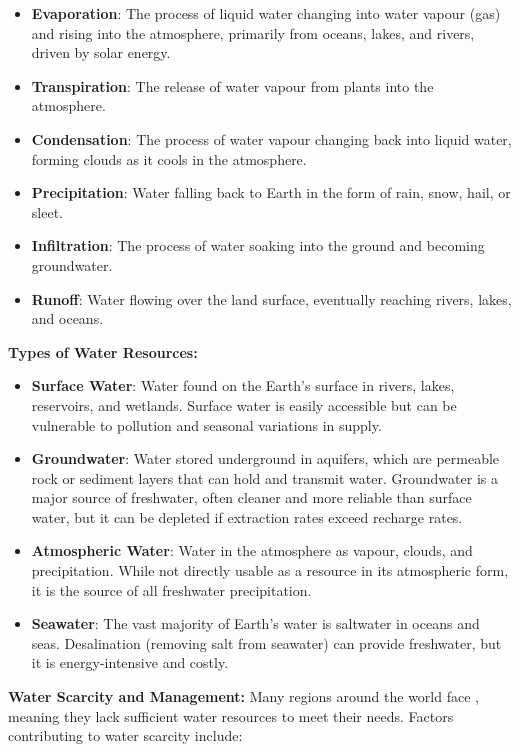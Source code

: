 \begin{itemize}
    \item \textbf{Evaporation}:  The process of liquid water changing into water vapour (gas) and rising into the atmosphere, primarily from oceans, lakes, and rivers, driven by solar energy.
    \item \textbf{Transpiration}:  The release of water vapour from plants into the atmosphere.
    \item \textbf{Condensation}:  The process of water vapour changing back into liquid water, forming clouds as it cools in the atmosphere.
    \item \textbf{Precipitation}:  Water falling back to Earth in the form of rain, snow, hail, or sleet.
    \item \textbf{Infiltration}:  The process of water soaking into the ground and becoming groundwater.
    \item \textbf{Runoff}:  Water flowing over the land surface, eventually reaching rivers, lakes, and oceans.
\end{itemize}

\textbf{Types of Water Resources:}

\begin{itemize}
    \item \textbf{Surface Water}:  Water found on the Earth's surface in rivers, lakes, reservoirs, and wetlands.  Surface water is easily accessible but can be vulnerable to pollution and seasonal variations in supply.
    \item \textbf{Groundwater}:  Water stored underground in aquifers, which are permeable rock or sediment layers that can hold and transmit water. Groundwater is a major source of freshwater, often cleaner and more reliable than surface water, but it can be depleted if extraction rates exceed recharge rates.
    \item \textbf{Atmospheric Water}: Water in the atmosphere as vapour, clouds, and precipitation. While not directly usable as a resource in its atmospheric form, it is the source of all freshwater precipitation.
    \item \textbf{Seawater}:  The vast majority of Earth's water is saltwater in oceans and seas.  Desalination (removing salt from seawater) can provide freshwater, but it is energy-intensive and costly.
\end{itemize}

\textbf{Water Scarcity and Management:}  Many regions around the world face , meaning they lack sufficient water resources to meet their needs.  Factors contributing to water scarcity include:

